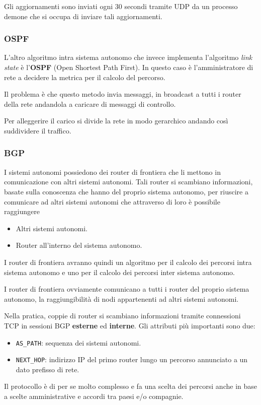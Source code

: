 Gli aggiornamenti sono inviati ogni 30 secondi tramite UDP da un 
processo demone che si occupa di inviare tali aggiornamenti.

\subsubsection{OSPF}
L'altro algoritmo intra sistema autonomo che invece implementa 
l'algoritmo \emph{link state} è l'\textbf{OSPF} (Open Shortest Path
First). In questo caso è l'amministratore di rete a decidere la metrica
per il calcolo del percorso.

Il problema è che questo metodo invia messaggi, in broadcast a tutti i
router della rete andandola a caricare di messaggi di controllo.

Per alleggerire il carico si divide la rete in modo gerarchico andando così suddividere il traffico.

\subsubsection{BGP}
I sistemi autonomi possiedono dei router di frontiera che li mettono
in comunicazione con altri sistemi autonomi.
Tali router si scambiano informazioni, basate sulla conoscenza che
hanno del proprio sistema autonomo, per riuscire a comunicare ad altri
sistemi autonomi che attraverso di loro è possibile raggiungere
\begin{itemize}
	\item Altri sistemi autonomi.
	\item Router all'interno del sistema autonomo.
\end{itemize}
I router di frontiera avranno quindi un algoritmo per il calcolo dei
percorsi intra sistema autonomo e uno per il calcolo dei percorsi 
inter sistema autonomo.

I router di frontiera ovviamente comunicano a tutti i router del 
proprio sistema autonomo, la raggiungibilità di nodi appartenenti ad
altri sistemi autonomi.

Nella pratica, coppie di router si scambiano informazioni tramite
connessioni TCP in sessioni BGP \textbf{esterne} ed \textbf{interne}.
Gli attributi più importanti sono due:
\begin{itemize}
	\item \verb|AS_PATH|: sequenza dei sistemi autonomi.
	\item \verb|NEXT_HOP|: indirizzo IP del primo router lungo un
		percorso annunciato a un dato prefisso di rete.
\end{itemize}
Il protocollo è di per se molto complesso e fa una scelta dei percorsi
anche in base a scelte amministrative e accordi tra paesi e/o 
compagnie.
